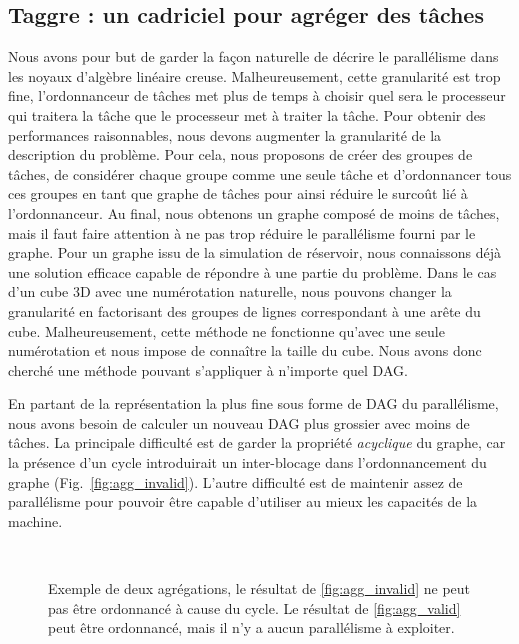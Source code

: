 \subsection{Taggre : un cadriciel pour agréger des tâches}
Nous avons pour but de garder la façon naturelle de décrire le parallélisme dans les noyaux d'algèbre linéaire creuse.
%
Malheureusement, cette granularité est trop fine, l'ordonnanceur de tâches met plus de temps à choisir quel sera le processeur qui traitera la tâche que le processeur met à traiter la tâche.
%
Pour obtenir des performances raisonnables, nous devons augmenter la granularité de la description du problème.
%
Pour cela, nous proposons de créer des groupes de tâches, de considérer chaque groupe comme une seule tâche et d'ordonnancer tous ces groupes en tant que graphe de tâches pour ainsi réduire le surcoût lié à l'ordonnanceur.
%
Au final, nous obtenons un graphe composé de moins de tâches, mais il faut faire attention à ne pas trop réduire le parallélisme fourni par le graphe.
%
Pour un graphe issu de la simulation de réservoir, nous connaissons déjà une solution efficace capable de répondre à une partie du problème.
%
Dans le cas d'un cube 3D avec une numérotation naturelle, nous pouvons changer la granularité en factorisant des groupes de lignes correspondant à une arête du cube.
%
Malheureusement, cette méthode ne fonctionne qu'avec une seule numérotation et nous impose de connaître la taille du cube.
%
Nous avons donc cherché une méthode pouvant s'appliquer à n'importe quel DAG.

En partant de la représentation la plus fine sous forme de DAG du parallélisme, nous avons besoin de calculer un nouveau DAG plus grossier avec moins de tâches.
%
La principale difficulté est de garder la propriété {\em acyclique} du graphe, car la présence d'un cycle introduirait un inter-blocage dans l'ordonnancement du graphe (Fig.~\ref{fig:agg_invalid}).
%
L'autre difficulté est de maintenir assez de parallélisme pour pouvoir être capable d'utiliser au mieux les capacités de la machine.


\begin{figure}[!h]
     \begin{center}
        ~
    \end{center}
    \caption{Exemple de deux agrégations, le résultat de \ref{fig:agg_invalid} ne peut pas être ordonnancé à cause du cycle. Le résultat de \ref{fig:agg_valid} peut être ordonnancé, mais il n'y a aucun parallélisme à exploiter.}
    \label{fig:agg_basic}
\end{figure}


